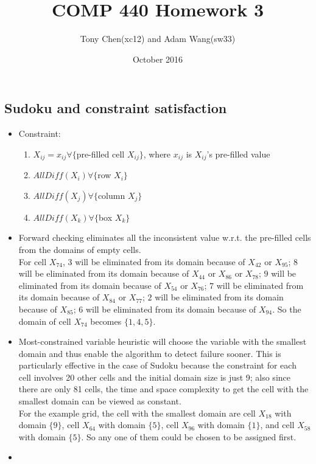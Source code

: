 \documentclass[11pt]{article}
\title{COMP 440 Homework 3}
\author{Tony Chen(xc12) and Adam Wang(sw33)}
\date{October 2016}
\begin{document}
\begin{onehalfspace}
\maketitle{}
\section{Sudoku and constraint satisfaction}
\begin{itemize}
	\item
	Constraint:
	\begin{enumerate}
		\item
		$X_{ij} = x_{ij}\forall \{$pre-filled cell $X_{ij}\}$, where $x_{ij}$ is $X_{ij}$'s pre-filled value
		\item
		$AllDiff(X_i)\forall\{$row $X_i\}$
		\item
		$AllDiff(X_j)\forall\{$column $X_j\}$
		\item
		$AllDiff(X_k)\forall\{$box $X_k\}$
	\end{enumerate}
	\item
	Forward checking eliminates all the inconsistent value w.r.t. the pre-filled cells from the domains of empty cells.\\
	For cell $X_{74}$, $3$ will be eliminated from its domain because of $X_{42}$ or $X_{95}$; $8$ will be eliminated from its domain because of $X_{44}$ or $X_{86}$ or $X_{78}$; $9$ will be eliminated from its domain because of $X_{54}$ or $X_{76}$; $7$ will be eliminated from its domain because of $X_{84}$ or $X_{77}$; $2$ will be eliminated from its domain because of $X_{85}$; $6$ will be eliminated from its domain because of $X_{94}$. So the domain of cell $X_{74}$ becomes $\{1,4,5\}$.
	\item
	Most-constrained variable heuristic will choose the variable with the smallest domain and thus enable the algorithm to detect failure sooner. This is particularly effective in the case of Sudoku because the constraint for each cell involves 20 other cells and the initial domain size is just 9; also since there are only 81 cells, the time and space complexity to get the cell with the smallest domain can be viewed as constant.\\
	For the example grid, the cell with the smallest domain are cell $X_{18}$ with domain $\{9\}$, cell $X_{64}$ with domain $\{5\}$, cell $X_{96}$ with domain $\{1\}$, and cell $X_{58}$ with domain $\{5\}$. So any one of them could be chosen to be assigned first.
	\item

\end{itemize}
\end{onehalfspace}
\end{document}
